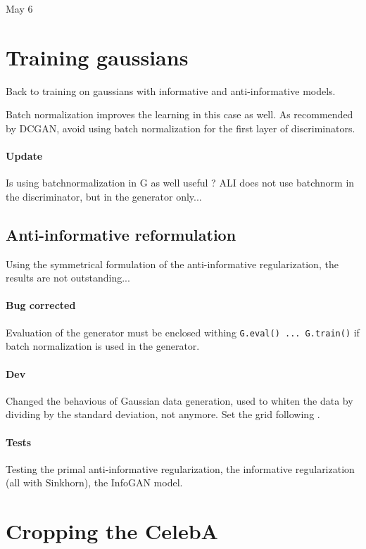 \documentclass[11pt,a4paper]{article}
\begin{document}

{\Huge May  6}

\section*{Training gaussians}

Back to training on gaussians with informative and anti-informative models.

Batch normalization improves the learning in this case as well. As recommended by DCGAN, avoid using batch normalization for the first layer of discriminators.

\paragraph{Update} Is using batchnormalization in G as well useful ? ALI does not use batchnorm in the discriminator, but in the generator only...

\subsection*{Anti-informative reformulation}

Using the symmetrical formulation of the anti-informative regularization, the results are not outstanding...

\paragraph{Bug corrected} Evaluation of the generator must be enclosed withing \texttt{G.eval() ... G.train()} if batch normalization is used in the generator.

\paragraph{Dev} Changed the behavious of Gaussian data generation, used to whiten the data
by dividing by the standard deviation, not anymore. Set the grid following
\cite{Dumoulin2016}.

\paragraph{Tests} Testing the primal anti-informative regularization, the informative regularization (all with Sinkhorn), the InfoGAN model.

\section*{Cropping the CelebA}
\end{document}
